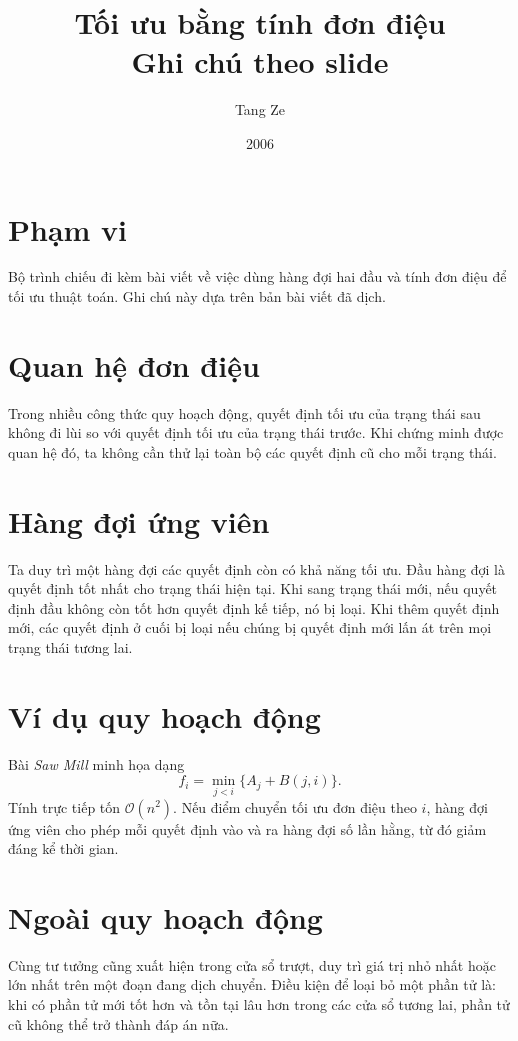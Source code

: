 \documentclass[11pt]{article}
\title{Tối ưu bằng tính đơn điệu\\{\large Ghi chú theo slide}}
\author{Tang Ze}
\date{2006}
\newcommand{\Oh}{\mathcal{O}}
\begin{document}
\maketitle


\section{Phạm vi}

Bộ trình chiếu đi kèm bài viết về việc dùng hàng đợi hai đầu và tính đơn điệu
để tối ưu thuật toán. Ghi chú này dựa trên bản bài viết đã dịch.

\section{Quan hệ đơn điệu}

Trong nhiều công thức quy hoạch động, quyết định tối ưu của trạng thái sau
không đi lùi so với quyết định tối ưu của trạng thái trước. Khi chứng minh
được quan hệ đó, ta không cần thử lại toàn bộ các quyết định cũ cho mỗi trạng
thái.

\section{Hàng đợi ứng viên}

Ta duy trì một hàng đợi các quyết định còn có khả năng tối ưu. Đầu hàng đợi
là quyết định tốt nhất cho trạng thái hiện tại. Khi sang trạng thái mới, nếu
quyết định đầu không còn tốt hơn quyết định kế tiếp, nó bị loại. Khi thêm
quyết định mới, các quyết định ở cuối bị loại nếu chúng bị quyết định mới lấn
át trên mọi trạng thái tương lai.

\section{Ví dụ quy hoạch động}

Bài \emph{Saw Mill} minh họa dạng
\[
  f_i=\min_{j<i}\{A_j+B(j,i)\}.
\]
Tính trực tiếp tốn \(\Oh(n^2)\). Nếu điểm chuyển tối ưu đơn điệu theo \(i\),
hàng đợi ứng viên cho phép mỗi quyết định vào và ra hàng đợi số lần hằng, từ
đó giảm đáng kể thời gian.

\section{Ngoài quy hoạch động}

Cùng tư tưởng cũng xuất hiện trong cửa sổ trượt, duy trì giá trị nhỏ nhất hoặc
lớn nhất trên một đoạn đang dịch chuyển. Điều kiện để loại bỏ một phần tử là:
khi có phần tử mới tốt hơn và tồn tại lâu hơn trong các cửa sổ tương lai, phần
tử cũ không thể trở thành đáp án nữa.
\end{document}
